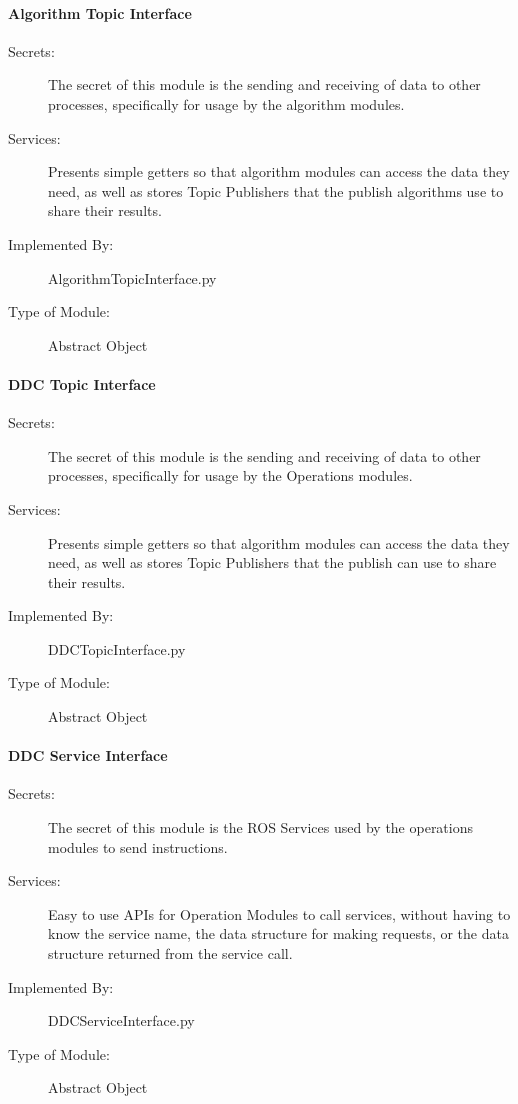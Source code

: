 \documentclass[12pt, titlepage]{article}
\begin{document}
\paragraph{Algorithm Topic Interface}
\label{Algorithm Topic Interface}
\begin{description}
\item[Secrets:] The secret of this module is the sending and receiving of data to other processes, specifically for usage by the algorithm modules. 
\item[Services:] Presents simple getters so that algorithm modules can access the data they need, as well as stores Topic Publishers that the publish algorithms use to share their results.
\item[Implemented By:] AlgorithmTopicInterface.py
\item[Type of Module:] Abstract Object
\end{description}

\paragraph{DDC Topic Interface}
\label{DDC Topic Interface}
\begin{description}
\item[Secrets:] The secret of this module is the sending and receiving of data to other processes, specifically for usage by the Operations modules. 
\item[Services:] Presents simple getters so that algorithm modules can access the data they need, as well as stores Topic Publishers that the publish  can use to share their results.
\item[Implemented By:] DDCTopicInterface.py
\item[Type of Module:] Abstract Object
\end{description}

\paragraph{DDC Service Interface}
\label{DDC Service Interface}
\begin{description}
\item[Secrets:] The secret of this module is the ROS Services used by the operations modules to send instructions. 
\item[Services:] Easy to use APIs for Operation Modules to call services, without having to know the service name, the data structure for making requests, or the data structure returned from the service call.
\item[Implemented By:] DDCServiceInterface.py
\item[Type of Module:] Abstract Object
\end{description}
\end{document}
